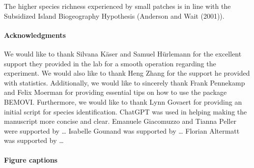 \documentclass[
]{article}
\begin{document}
The higher species richness experienced by small patches is in line with
the Subsidized Island Biogeography Hypothesis (Anderson and Wait
(2001)).

\hypertarget{acknowledgments}{%
\paragraph{Acknowledgments}\label{acknowledgments}}

We would like to thank Silvana Käser and Samuel Hürlemann for the
excellent support they provided in the lab for a smooth operation
regarding the experiment. We would also like to thank Heng Zhang for the
support he provided with statistics. Additionally, we would like to
sincerely thank Frank Pennekamp and Felix Moerman for providing
essential tips on how to use the package BEMOVI. Furthermore, we would
like to thank Lynn Govaert for providing an initial script for species
identification. ChatGPT was used in helping making the manuscript more
concise and clear. Emanuele Giacomuzzo and Tianna Peller were supported
by \ldots{} Isabelle Gounand was supported by \ldots{} Florian Altermatt
was supported by \ldots{}

\hypertarget{figure-captions}{%
\paragraph{Figure captions}\label{figure-captions}}
\end{document}
